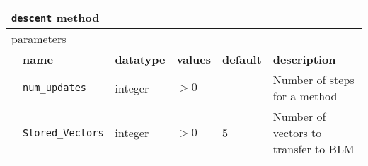 \begin{table}[H]
\begin{center}
\begin{tabularx}{\textwidth}{l l l l l X }
\hline
\multicolumn{6}{l}{\texttt{descent} method} \\
\hline
\multicolumn{2}{l}{parameters}  & \multicolumn{4}{l}{}\\
   &   \bfseries name     & \bfseries datatype & \bfseries values & \bfseries default   & \bfseries description \\
   &   \texttt{num\_updates} &  integer     & $>0$ &  & Number of steps for a method\\
   &   \texttt{Stored\_Vectors} &  integer     & $>0$ & 5 & Number of vectors to transfer to BLM\\
  \hline
\end{tabularx}
\end{center}
\end{table}


